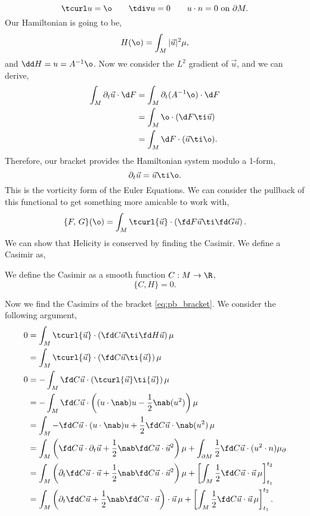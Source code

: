 $$ \tcurl u = \o \qquad \tdiv u = 0 \qquad u \cdot n = 0 \text{ on }\partial M. $$
Our Hamiltonian is going to be,
$$ H(\o) = \int_M |\vec u|^2 \mu, $$
and $\dd H = u = A^{-1}\o$. Now we consider the $L^2$ gradient of $\vec u$, and we can derive,
\begin{align*}
  \int_M \partial_t \vec u \cdot \d F &= \int_M \partial_t (A^{-1}\o) \cdot \d F \\
  &= \int_M \o \cdot (\d F \ti \vec u)\\
  &= \int_M \d F \cdot (\vec u \ti \o).
\end{align*}
Therefore, our bracket provides the Hamiltonian system modulo a 1-form,
$$ \partial_t \vec u = \vec u \ti \o. $$
This is the vorticity form of the Euler Equations. We can consider the pullback of this functional to get something more amicable to work with,
\begin{equation}
  \{F,\, G\}(\o) = \int_M \tcurl {\vec u} \cdot \left( \fd F {\vec u} \ti \fd G {\vec u}  \right).\label{eq:pb_bracket}
\end{equation}
We can show that Helicity is conserved by finding the Casimir. We define a Casimir as,
\begin{ndefi}[Casimir]
  We define the Casimir as a smooth function $C : M \to \R$,
  $$ \{C, H\} = 0. $$
\end{ndefi}
\noindent
Now we find the Casimirs of the bracket \eqref{eq:pb_bracket}. We consider the following argument,
\begin{align*}
  0 &= \int_M \tcurl {\vec u} \cdot \left( \fd C {\vec u} \ti \fd H {\vec u}  \right)\mu \\
  &= \int_M \tcurl {\vec u} \cdot \left( \fd C {\vec u} \ti {\vec u}  \right)\mu \\
  0 &= - \int_M \fd C {\vec u} \cdot \left( \tcurl {\vec u} \ti {\vec u} \right)\mu \\
  &= - \int_M \fd C {\vec u} \cdot \left( (u \cdot \nab)u - \frac{1}{2}\nab(u^2) \right)\mu \\
  &= \int_M -\fd C {\vec u} \cdot (u \cdot\nab)u + \frac{1}{2}\fd C {\vec u} \cdot \nab(u^2)\,\mu \\
  &= \int_M \left(\fd C {\vec u} \cdot \partial_t {\vec u} + \frac{1}{2}\nab\fd C {\vec u} \cdot {\vec u}^2\right) \mu + \int_{\partial M} \frac{1}{2}\fd C {\vec u} \cdot (u^2 \cdot n) \mu_\partial  \\
  &= \int_M \left(\partial_t\fd C {\vec u} \cdot {\vec u} + \frac{1}{2}\nab\fd C {\vec u} \cdot {\vec u}^2\right) \mu + \left[\int_M \frac{1}{2}\fd C {\vec u} \cdot {\vec u}\,\mu\right]_{t_1}^{t_2} \\
  &= \int_M \left(\partial_t\fd C {\vec u} + \frac{1}{2}\nab\fd C {\vec u} \cdot {\vec u}\right) \cdot {\vec u}\, \mu + \left[\int_M \frac{1}{2}\fd C {\vec u} \cdot {\vec u}\,\mu\right]_{t_1}^{t_2}.
\end{align*}
